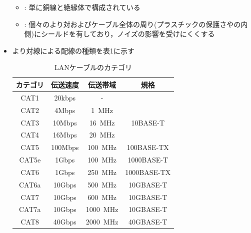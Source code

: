 \documentclass[a4paper]{ltjsarticle}
\begin{document}
\begin{itemize}
\begin{itemize}
					\item {} : 単に銅線と絶縁体で構成されている
					\item {} : 個々のより対およびケーブル全体の周り(プラスチックの保護さやの内側)にシールドを有しており，ノイズの影響を受けにくくする
				\end{itemize}
				\item より対線による配線の種類を表1に示す\cite{lan}
					\begin{table}[H]
						\centering
						\caption{LANケーブルのカテゴリ}
						\begin{tabular}{c|c|c|c}
							カテゴリ & 伝送速度 & 伝送帯域 & 規格 \\ \hline
							CAT1 & 20kbps & - & \\
							CAT2 & 4Mbps & \SI{1}{MHz} & \\
							CAT3 & 10Mbps & \SI{16}{MHz} & 10BASE-T\\
							CAT4 & 16Mbps & \SI{20}{MHz} & \\
							CAT5 & 100Mbps & \SI{100}{MHz} & 100BASE-TX\\
							CAT5e & 1Gbps & \SI{100}{MHz} & 1000BASE-T\\
							CAT6 & 1Gbps & \SI{250}{MHz} & 1000BASE-TX\\
							CAT6a & 10Gbps & \SI{500}{MHz} & 10GBASE-T\\
							CAT7 & 10Gbps & \SI{600}{MHz} & 10GBASE-T\\
							CAT7a & 10Gbps & \SI{1000}{MHz} & 10GBASE-T\\
							CAT8 & 40Gbps & \SI{2000}{MHz} & 40GBASE-T\\
						\end{tabular}
					\end{table}
			\end{itemize}
\end{document}
